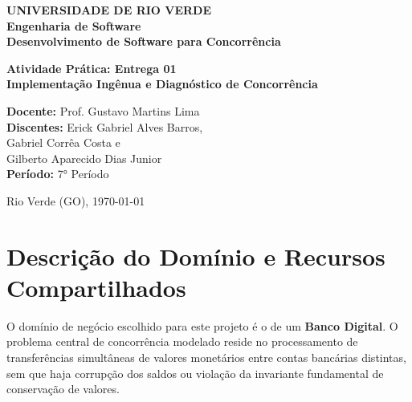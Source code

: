 \documentclass[12pt,a4paper]{article}
\begin{document}
\sloppy

\begin{titlepage}
\begin{center}
\textbf{\large UNIVERSIDADE DE RIO VERDE}\\[1cm]
\textbf{\large Engenharia de Software}\\[1cm]
\textbf{\large Desenvolvimento de Software para Concorrência}\\[1cm]

\vspace{2cm}

\textbf{\LARGE Atividade Prática: Entrega 01}\\[0.5cm]
\textbf{\Large Implementação Ingênua e Diagnóstico de Concorrência}\\[3cm]
\end{center}

\begin{flushright}
\textbf{Docente:} Prof. Gustavo Martins Lima \\[0.2cm]
\textbf{Discentes:} Erick Gabriel Alves Barros, \\
Gabriel Corrêa Costa e \\
Gilberto Aparecido Dias Junior \\[0.2cm]
\textbf{Período:} 7° Período
\end{flushright}

\begin{center}
\vfill
Rio Verde (GO), \today
\end{center}
\end{titlepage}

\section{Descrição do Domínio e Recursos Compartilhados}

\noindent O domínio de negócio escolhido para este projeto é o de um \textbf{Banco Digital}. O problema central de concorrência modelado reside no processamento de transferências simultâneas de valores monetários entre contas bancárias distintas, sem que haja corrupção dos saldos ou violação da invariante fundamental de conservação de valores.
\end{document}
